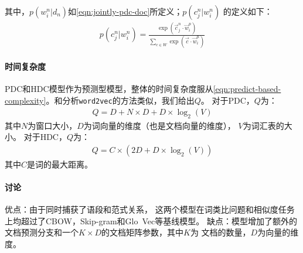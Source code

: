 其中，$p(w_i^n|d_n)$如\cref{eqn:jointly-pdc-doc}所定义；$p(c_j^n|w_i^n)$ 的定义如下：
\begin{align}
  p(c_j^n|w_i^n) = \frac{\exp(\vec{c}_j^n \cdot \vec{w}_i^n)}%
  {\sum_{c \in W} \exp(\vec{c} \cdot \vec{w}_i^n)}
  \label{eqn:jointly-hdc-word}
\end{align}

\paragraph{时间复杂度}
PDC和HDC模型作为预测型模型，整体的时间复杂度服从\cref{eqn:predict-based-complexity}。和分析\texttt{word2vec}的方法类似，我们给出$Q$。
对于PDC，$Q$为：
\begin{align}
  Q = D + N \times D + D \times \log_2(V)
  \label{eqn:jointly-pdc-complexity}
\end{align}
其中$N$为窗口大小，$D$为词向量的维度（也是文档向量的维度），
$V$为词汇表的大小。
对于HDC，$Q$为：
\begin{align}
  Q = C \times (2D + D \times \log_2(V))
  \label{eqn:jointly-hdc-complexity}
\end{align}
其中$C$是词的最大距离。

\paragraph{讨论}
优点：由于同时捕获了语段和范式关系，
这两个模型在词类比问题和相似度任务上均超过了CBOW，Skip-gram和Glo~Vec等基线模型。
缺点：模型增加了额外的文档预测分支和一个$K \times D$的文档矩阵参数，其中$K$为
文档的数量，$D$为向量的维度。
